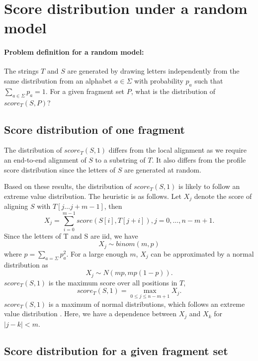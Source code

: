 \section{Score distribution under a random model}
\paragraph{Problem definition for a random model:}
The strings $T$ and $S$ are generated by drawing letters independently
from the same distribution from an alphabet $a \in \Sigma$ with
probability $p_a$ such that $\sum_{a \in \Sigma} p_a = 1$.
For a given fragment set $P$, what is the distribution of $score_T(S,
P)$?


\subsection{Score distribution of one fragment}
The distribution of $score_T(S,1)$ differs from the local alignment as
we require an end-to-end alignment of $S$ to a substring of $T$. It also
differs from the profile score distribution since the letters of $S$ are
generated at random.

Based on these results, the distribution of $score_T(S,1)$ is likely to
follow an extreme value distribution. The heuristic is as follows.
Let $X_j$ denote the score of aligning $S$ with $T[j \dots j+m-1]$, then
\[X_j = \sum_{i=0}^{m-1} score(S[i],T[j+i]), j = 0, \dots, n-m+1.\]
Since the letters of T and S are iid, we have \[X_j \sim binom(m,p)\]
where $p = \sum_{a=\Sigma} p_a^2$.  For a large enough $m$, $X_j$ can
be approximated by a normal distribution as \[X_j \sim N(mp, mp(1-p)).
\] $score_T(S,1)$ is the maximum score over all positions in $T$,
\[score_T(S,1) = \max_{0 \leq j \leq n-m+1} X_j.\] $score_T(S,1)$ is a
maximum of normal distributions, which follows an extreme value
distribution \cite{kotz2000extreme}.
Here, we have a dependence between $X_j$ and $X_k$ for $|j - k| < m$.




\subsection{Score distribution for a given fragment set}


